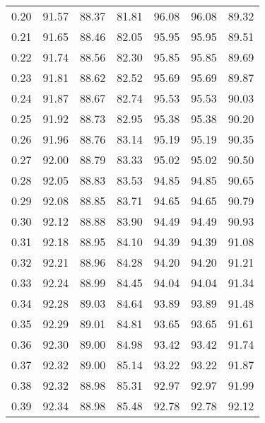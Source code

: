 \begin{tabular}{|c|c|c|c|c|c|c|}
      0.20 &     91.57 &     88.37 &      81.81 &   96.08 &      96.08 &         89.32 \\
      0.21 &     91.65 &     88.46 &      82.05 &   95.95 &      95.95 &         89.51 \\
      0.22 &     91.74 &     88.56 &      82.30 &   95.85 &      95.85 &         89.69 \\
      0.23 &     91.81 &     88.62 &      82.52 &   95.69 &      95.69 &         89.87 \\
      0.24 &     91.87 &     88.67 &      82.74 &   95.53 &      95.53 &         90.03 \\
      0.25 &     91.92 &     88.73 &      82.95 &   95.38 &      95.38 &         90.20 \\
      0.26 &     91.96 &     88.76 &      83.14 &   95.19 &      95.19 &         90.35 \\
      0.27 &     92.00 &     88.79 &      83.33 &   95.02 &      95.02 &         90.50 \\
      0.28 &     92.05 &     88.83 &      83.53 &   94.85 &      94.85 &         90.65 \\
      0.29 &     92.08 &     88.85 &      83.71 &   94.65 &      94.65 &         90.79 \\
      0.30 &     92.12 &     88.88 &      83.90 &   94.49 &      94.49 &         90.93 \\
      0.31 &     92.18 &     88.95 &      84.10 &   94.39 &      94.39 &         91.08 \\
      0.32 &     92.21 &     88.96 &      84.28 &   94.20 &      94.20 &         91.21 \\
      0.33 &     92.24 &     88.99 &      84.45 &   94.04 &      94.04 &         91.34 \\
      0.34 &     92.28 &     89.03 &      84.64 &   93.89 &      93.89 &         91.48 \\
      0.35 &     92.29 &     89.01 &      84.81 &   93.65 &      93.65 &         91.61 \\
      0.36 &     92.30 &     89.00 &      84.98 &   93.42 &      93.42 &         91.74 \\
      0.37 &     92.32 &     89.00 &      85.14 &   93.22 &      93.22 &         91.87 \\
      0.38 &     92.32 &     88.98 &      85.31 &   92.97 &      92.97 &         91.99 \\
      0.39 &     92.34 &     88.98 &      85.48 &   92.78 &      92.78 &         92.12 \\

\end{tabular}

